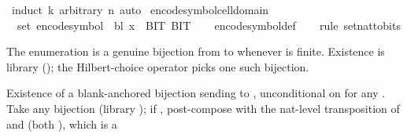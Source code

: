 \begin{isabellebody}
\ {\isacharparenleft}{\kern0pt}induct\ k\ arbitrary{\isacharcolon}{\kern0pt}\ n{\isacharparenright}{\kern0pt}\ auto%
\endisatagproof
{\isafoldproof}%
%
\isadelimproof
\isanewline
%
\endisadelimproof
\isanewline
{}\isamarkupfalse%
\ encode{\isacharunderscore}{\kern0pt}symbol{\isacharunderscore}{\kern0pt}cell{\isacharunderscore}{\kern0pt}domain{\isacharcolon}{\kern0pt}\isanewline
\ \ {\isachardoublequoteopen}set\ {\isacharparenleft}{\kern0pt}encode{\isacharunderscore}{\kern0pt}symbol\ {\isasymGamma}\ bl\ x{\isacharparenright}{\kern0pt}\ {\isasymsubseteq}\ {\isacharbraceleft}{\kern0pt}BIT{}{\isacharcomma}{\kern0pt}\ BIT{}{\isacharbraceright}{\kern0pt}{\isachardoublequoteclose}\isanewline
%
\isadelimproof
\ \ %
\endisadelimproof
%
\isatagproof
{}\isamarkupfalse%
\ encode{\isacharunderscore}{\kern0pt}symbol{\isacharunderscore}{\kern0pt}def\isanewline
\ \ \isamarkupfalse%
\ {\isacharparenleft}{\kern0pt}rule\ set{\isacharunderscore}{\kern0pt}nat{\isacharunderscore}{\kern0pt}to{\isacharunderscore}{\kern0pt}bits{\isacharparenright}{\kern0pt}%
\endisatagproof
{\isafoldproof}%
%
\isadelimproof
%
\endisadelimproof
%
\begin{isamarkuptext}%
The enumeration  is a genuine bijection
  from \isa{{\isasymGamma}} to  whenever \isa{{\isasymGamma}} is
  finite.  Existence is library
  (); the Hilbert-choice operator
  picks one such bijection.%
\end{isamarkuptext}\isamarkuptrue%
%
\begin{isamarkuptext}%
Existence of a blank-anchored bijection
   sending  to ,
  unconditional on  for any .  Take any
  bijection  (library ); if
  , post-compose with the nat-level transposition of
   and  (both ), which is a

\end{isamarkuptext}
\end{isabellebody}
